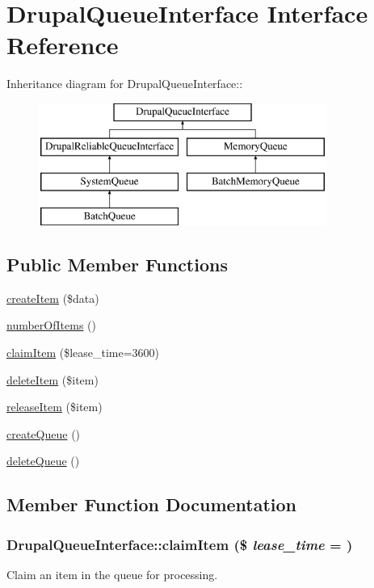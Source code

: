 \hypertarget{interfaceDrupalQueueInterface}{
\section{DrupalQueueInterface Interface Reference}
\label{interfaceDrupalQueueInterface}
}
Inheritance diagram for DrupalQueueInterface::\begin{figure}[H]
\begin{center}
\leavevmode
\includegraphics[height=4cm]{interfaceDrupalQueueInterface}
\end{center}
\end{figure}
\subsection*{Public Member Functions}
\begin{DoxyCompactItemize}
\item 
\hyperlink{interfaceDrupalQueueInterface_a1bdef6341808aaf8b3de821b7b71f137}{createItem} (\$data)
\item 
\hyperlink{interfaceDrupalQueueInterface_aee5a22d355c9e6246690d0ed79fe306b}{numberOfItems} ()
\item 
\hyperlink{interfaceDrupalQueueInterface_a2f0f2ccc1f4d55c0890897ea85e75954}{claimItem} (\$lease\_\-time=3600)
\item 
\hyperlink{interfaceDrupalQueueInterface_aa61212089c1bcc410e8f87f8e619e351}{deleteItem} (\$item)
\item 
\hyperlink{interfaceDrupalQueueInterface_a7f4ce9d592779327cd24dbf90566da67}{releaseItem} (\$item)
\item 
\hyperlink{interfaceDrupalQueueInterface_a5a657d8c1d5bb429b3e594fa0c883ad3}{createQueue} ()
\item 
\hyperlink{interfaceDrupalQueueInterface_ad403fed96dbd86e64a8a48c33fe5f2bc}{deleteQueue} ()
\end{DoxyCompactItemize}


\subsection{Member Function Documentation}
\hypertarget{interfaceDrupalQueueInterface_a2f0f2ccc1f4d55c0890897ea85e75954}{
\subsubsection[{claimItem}]{\setlength{\rightskip}{0pt plus 5cm}DrupalQueueInterface::claimItem (\$ {\em lease\_\-time} = {})}}
\label{interfaceDrupalQueueInterface_a2f0f2ccc1f4d55c0890897ea85e75954}
Claim an item in the queue for processing.



